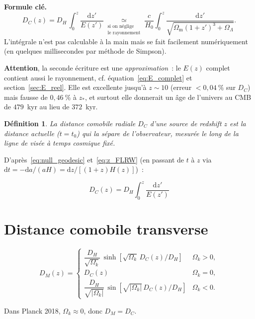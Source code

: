 \documentclass[11pt,a4paper,openany]{report}
\newcommand{\dif}{\mathrm{d}}
\newcommand{\Hzero}{H_{0}}
\newcommand{\Om}{\Omega_{\mathrm{m}}}
\newcommand{\OL}{\Omega_{\Lambda}}
\newcommand{\Ok}{\Omega_{k}}
\newtheorem{definition}[theorem]{Définition}
\begin{document}
\begin{tcolorbox}[mathspe]
\textbf{Formule clé.}
\[
D_{C}(z) = D_{H}\,\int_{0}^{z}\frac{\dif z'}{E(z')}
         \underset{\substack{\text{si on néglige}\\\text{le rayonnement}}}{\simeq}
           \frac{c}{\Hzero}\int_{0}^{z}\frac{\dif z'}{\sqrt{\Om(1+z')^{3} + \OL}}.
\]
L'intégrale n'est pas calculable à la main mais se fait facilement
numériquement (en quelques millisecondes par méthode de Simpson).

\medskip
\textbf{Attention}, la seconde écriture est une \emph{approximation}~: le
$E(z)$ complet contient aussi le rayonnement, cf. équation~\eqref{eq:E_complet}
et section~\ref{sec:E_reel}. Elle est excellente jusqu'à $z\sim 10$
(erreur $< 0{,}04~\%$ sur $D_{C}$) mais fausse de $0{,}46~\%$ à $z_{*}$, et
surtout elle donnerait un âge de l'univers au CMB de $479$~kyr au lieu de
$372$~kyr.
\end{tcolorbox}

\begin{definition}
La \emph{distance comobile radiale} $D_{C}$ d'une source de redshift $z$ est la
distance \emph{actuelle} ($t=t_0$) qui la sépare de l'observateur, mesurée le long
de la ligne de visée à temps cosmique fixé.
\end{definition}

D'après~\eqref{eq:null_geodesic} et~\eqref{eq:z_FLRW} (en passant de $t$ à $z$
via $\dif t = -\dif a/(aH) = \dif z / [(1+z)H(z)]$)~:

\begin{equation}
\boxed{\;D_{C}(z) = D_{H}\int_{0}^{z}\frac{\dif z'}{E(z')}\;}
\label{eq:DC}
\end{equation}

\section{Distance comobile transverse}

\begin{equation}
D_{M}(z) =
\begin{cases}
\dfrac{D_{H}}{\sqrt{\Ok}}\,\sinh\!\left[\sqrt{\Ok}\,D_{C}(z)/D_{H}\right] & \Ok>0,\\[6pt]
D_{C}(z) & \Ok=0,\\[6pt]
\dfrac{D_{H}}{\sqrt{|\Ok|}}\,\sin\!\left[\sqrt{|\Ok|}\,D_{C}(z)/D_{H}\right] & \Ok<0.
\end{cases}
\label{eq:DM}
\end{equation}

\noindent Dans Planck 2018, $\Ok \approx 0$, donc $D_{M} = D_{C}$.
\end{document}
